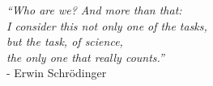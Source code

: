 	

\vfill

\begin{adjustwidth}{6cm}{0cm}
\begin{flushright}
\singlespacing
\emph{
``Who are we? And more than that: \\
I consider this not only one of the tasks,\\
 but \emph{the} task, of science, \\
the only one that really counts.''}\\
- Erwin Schr\"{o}dinger \cite{SchrodingerQuote}
\end{flushright}
\end{adjustwidth}
\onehalfspacing



